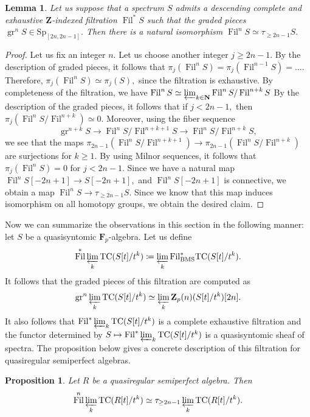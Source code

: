 \documentclass[10pt,letterpaper]{amsart}
\numberwithin{figure}{section}
\numberwithin{equation}{section}
\newtheorem{lemma}[figure]{Lemma}
\newtheorem{proposition}[figure]{Proposition}
\theoremstyle{definition}
\theoremstyle{definition}
\theoremstyle{definition}
\theoremstyle{definition}
\DeclareMathOperator{\gr}{gr}
\DeclareMathOperator{\Fil}{Fil}
\newcommand{\TC}{\mathrm{TC}}
\newcommand{\Z}{\mathbf{Z}}
\newcommand{\F}{\mathbf{F}}
\begin{document}
\begin{lemma}\label{filtrationlemma}
    Let us suppose that a spectrum $S$ admits a descending complete and exhaustive $\Z$-indexed filtration $\Fil^* S$ such that the graded pieces $\gr^n S \in \mathrm{Sp}_{[2n,2n-1]}.$ Then there is a natural isomorphism $\Fil^n S \simeq \tau_{\ge 2n-1} S.$
\end{lemma}{}

\begin{proof}
 Let us fix an integer $n.$ Let us choose another integer $j \ge 2n-1.$  By the description of graded pieces, it follows that $\pi_j (\Fil^n S) = \pi_j (\Fil^{n-1}S) = \ldots.$ Therefore, $\pi_j (\Fil^n S) \simeq \pi_j (S),$ since the filtration is exhaustive. By completeness of the filtration, we have $\Fil^n S \simeq \varprojlim _{k \in \mathbf N} \Fil^n S/ \Fil^{n+k}S$ By the description of the graded pieces, it follows that if $j < 2n-1,$ then $\pi_j (\Fil^n S/ \Fil^{n+k}) \simeq 0.$ Moreover, using the fiber sequence 
$$\gr^{n+k} S \to \Fil^n S/ \Fil^{n+k+1} S \to \Fil^n S/ \Fil^{n+k} S ,$$ we see that the maps $\pi_{2n-1} (\Fil^n S/ \Fil^{n+k+1}) \to \pi_{2n-1} (\Fil^n S/ \Fil^{n+k})$ are surjections for $k \ge 1.$ By using Milnor sequences, it follows that $\pi_j (\Fil^n S) = 0$ for $j < 2n-1.$ Since we have a natural map $\Fil^n S[-2n+1] \to S[-2n+1],$ and $\Fil^n S[-2n+1]$ is connective, we obtain a map $\Fil^n S \to \tau_{\ge 2n-1} S.$ Since we know that this map induces isomorphism on all homotopy groups, we obtain the desired claim.
\end{proof}{}

Now we can summarize the observations in this section in the following manner: let $S$ be a quasisyntomic $\F_p$-algebra. Let us define $$\Fil^* \varprojlim_k \TC (S[t]/t^k)\coloneqq \varprojlim_k \mathrm{Fil}_{\mathrm{BMS}}^* \TC (S[t]/t^k).$$
It follows that the graded pieces of this filtration are computed as $$\mathrm{gr}^n \varprojlim_k \TC (S[t]/t^k) \simeq \varprojlim_{k} \Z_p(n) (S[t]/t^k)[2n].$$ It also follows that $\Fil^* \varprojlim_k \TC (S[t]/t^k)$ is a complete exhaustive filtration and the functor determined by $S \mapsto \Fil^* \varprojlim_k \TC (S[t]/t^k)$ is a quasisyntomic sheaf of spectra. The proposition below gives a concrete description of this filtration for quasiregular semiperfect algebras.


\begin{proposition}\label{prop1}
    Let $R$ be a quasiregular semiperfect algebra. Then $$\Fil^n \varprojlim_k \TC (R[t]/t^k) \simeq \tau_{\ge 2n-1}  \varprojlim_k \TC (R[t]/t^k).$$
\end{proposition}{}
\end{document}
